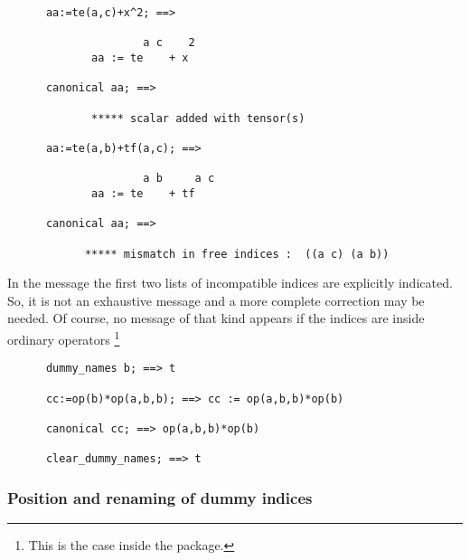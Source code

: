 \begin{verbatim}
      aa:=te(a,c)+x^2; ==>

                     a c    2
             aa := te    + x

      canonical aa; ==>

             ***** scalar added with tensor(s)

      aa:=te(a,b)+tf(a,c); ==>

                     a b     a c
             aa := te    + tf

      canonical aa; ==>

            ***** mismatch in free indices :  ((a c) (a b))
\end{verbatim}
In the message the first two lists of incompatible indices are
explicitly indicated. So, it is not an exhaustive message and a more
complete correction may be needed.
Of course, no message of that kind appears if the indices are inside
ordinary operators%
\footnote{This is the case inside the  package.}
\begin{verbatim}
      dummy_names b; ==> t

      cc:=op(b)*op(a,b,b); ==> cc := op(a,b,b)*op(b)

      canonical cc; ==> op(a,b,b)*op(b)

      clear_dummy_names; ==> t
\end{verbatim}
\subsubsection{Position and renaming of dummy indices}


